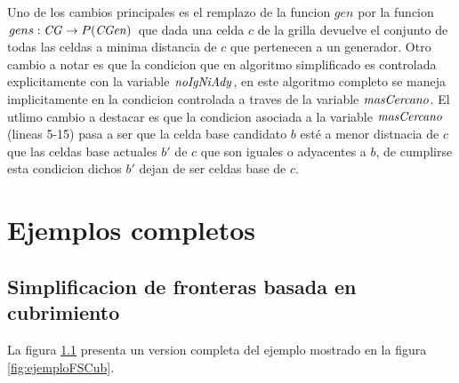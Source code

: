 \newpage
Uno de los cambios principales es el remplazo de la funcion $gen$ por la
funcion $gens : \mathit{CG} \rightarrow P(\mathit{CGen})$ que dada una celda $c$ de
la grilla devuelve el conjunto de todas las celdas a minima distancia de $c$ que pertenecen a
un generador. Otro cambio a notar es que la condicion que en algoritmo
simplificado es controlada explicitamente con la variable $\mathit{noIgNiAdy}$, en
este algoritmo completo se maneja implicitamente en la condicion controlada
a traves de la variable $\mathit{masCercano}$. El utlimo cambio a destacar es que la
condicion asociada a la variable $\mathit{masCercano}$ (lineas 5-15) pasa a
ser que la celda base candidato $b$ esté a menor distnacia de $c$ que las
celdas base actuales $b'$ de $c$ que son iguales o adyacentes a $b$, de cumplirse esta
condicion dichos $b'$ dejan de ser celdas base de $c$.
\newpage

\chapter{Ejemplos completos}
\begingroup
\small
\section{Simplificacion de fronteras basada en cubrimiento}\label{EXE:sfbc}
La figura \ref{EXE:sfbc} presenta un version completa del ejemplo mostrado en la figura \ref{fig:ejemploFSCub}.
\endgroup
\begin{figure}[H]
  \centerfloat


\end{figure}

